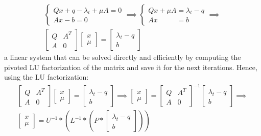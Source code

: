 \documentclass[notitlepage]{article}
\begin{document}
\begin{gather*}
  \begin{cases}
    Q x + q - \lambda_t + \mu A = 0 \\
    A x - b = 0
  \end{cases}
  \boldsymbol{\implies} 
  \begin{cases}
    Q x + \mu A = \lambda_t - q \\
    A x \quad \quad \:\ \,= b 
  \end{cases}
  \boldsymbol{\implies} \\ 
  \begin{bmatrix}
    Q & A^T \\[1ex]
    A & 0 
  \end{bmatrix}
  \begin{bmatrix}
    x \\[1ex]
    \mu
  \end{bmatrix}
  = 
  \begin{bmatrix}
    \lambda_t - q \\[1ex]
    b
  \end{bmatrix}
\end{gather*}
a linear system that can be solved directly and efficiently by computing the pivoted LU factorization of the matrix and save it for the next iterations. Hence, using the LU factorization:
\begin{gather*}
  \begin{bmatrix}
    Q & A^T \\[1ex]
    A & 0 
  \end{bmatrix} 
  \begin{bmatrix}
    x \\[1ex]
    \mu
  \end{bmatrix}
  = 
  \begin{bmatrix}
    \lambda_t - q \\[1ex]
    b
  \end{bmatrix}
  \boldsymbol{\implies} 
  \begin{bmatrix}
    x \\[1ex]
    \mu
  \end{bmatrix}
  = 
  \begin{bmatrix}
    Q & A^T \\[1ex]
    A & 0 
  \end{bmatrix}^{-1}
  \begin{bmatrix}
    \lambda_t - q \\[1ex]
    b
  \end{bmatrix}
  \boldsymbol{\implies} \\
  \begin{bmatrix}
    x \\[1ex]
    \mu
  \end{bmatrix}
  = 
  U^{-1} * \left(L^{-1} * \left(P * \begin{bmatrix}
    \lambda_t - q \\[1ex]
    b
  \end{bmatrix}\right) \right)
\end{gather*}
\end{document}
